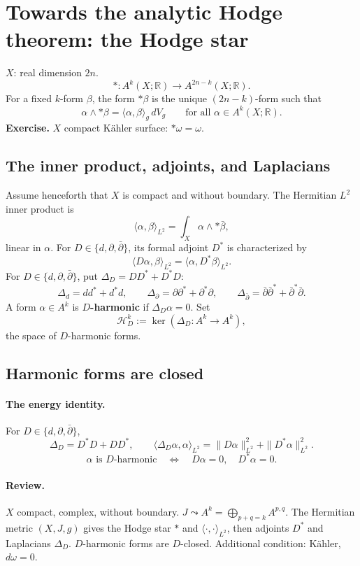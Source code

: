 \documentclass[11pt]{article}
\newcommand{\R}{\mathbb R}
\newcommand{\bdel}{\bar\partial}
\begin{document}
\section*{Towards the analytic Hodge theorem: the Hodge star}
$X$: real dimension $2n$.
\[
 *:A^k(X;\R)\longrightarrow A^{2n-k}(X;\R).
\]
For a fixed $k$-form $\beta$, the form $*\beta$ is the unique
$(2n-k)$-form such that
\[
 \alpha\wedge *\beta=\langle\alpha,\beta\rangle_g\,dV_g
 \qquad\text{for all }\alpha\in A^k(X;\R).
\]
\textbf{Exercise.} $X$ compact K\"ahler surface: $*\omega=\omega$.

\subsection*{The inner product, adjoints, and Laplacians}
Assume henceforth that $X$ is compact and without boundary.
The Hermitian $L^2$ inner product is
\[
 \langle\alpha,\beta\rangle_{L^2}=\int_X\alpha\wedge *\bar\beta,
\]
linear in $\alpha$. For $D\in\{d,\partial,\bdel\}$, its formal adjoint
$D^*$ is characterized by
\[
 \langle D\alpha,\beta\rangle_{L^2}
 =\langle\alpha,D^*\beta\rangle_{L^2}.
\]
For $D\in\{d,\partial,\bdel\}$, put $\Delta_D=DD^*+D^*D$:
\[
 \Delta_d=dd^*+d^*d,\qquad
 \Delta_{\partial}=\partial\partial^*+\partial^*\partial,\qquad
 \Delta_{\bdel}=\bdel\bdel^*+\bdel^*\bdel.
\]
A form $\alpha\in A^k$ is \textbf{$D$-harmonic} if $\Delta_D\alpha=0$.
Set
\[
 \mathcal H_D^k:=\ker(\Delta_D:A^k\longrightarrow A^k),
\]
the space of $D$-harmonic forms.

\subsection*{Harmonic forms are closed}
\paragraph{The energy identity.}
For $D\in\{d,\partial,\bdel\}$,
\[
 \Delta_D=D^*D+DD^*,\qquad
 \langle\Delta_D\alpha,\alpha\rangle_{L^2}
 =\|D\alpha\|_{L^2}^2+\|D^*\alpha\|_{L^2}^2.
\]
\[
 \alpha\text{ is $D$-harmonic}
 \quad\Longleftrightarrow\quad
 D\alpha=0,\quad D^*\alpha=0.
\]
\paragraph{Review.}
$X$ compact, complex, without boundary.
$J\leadsto A^k=\bigoplus_{p+q=k}A^{p,q}$.
The Hermitian metric $(X,J,g)$ gives the Hodge star $*$ and
$\langle\cdot,\cdot\rangle_{L^2}$, then adjoints $D^*$ and Laplacians
$\Delta_D$. $D$-harmonic forms are $D$-closed.
Additional condition: K\"ahler, $d\omega=0$.
\end{document}
